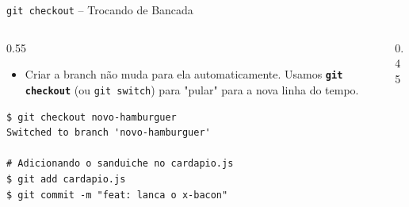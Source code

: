 \documentclass[aspectratio=169]{beamer}
\begin{document}
\begin{frame}[fragile]{\texttt{git checkout} -- Trocando de Bancada}
    \begin{columns}
        \begin{column}{0.55\textwidth}
            \begin{itemize}
                \item Criar a branch não muda para ela automaticamente. Usamos \textbf{\texttt{git checkout}} (ou \texttt{git switch}) para "pular" para a nova linha do tempo.
            \end{itemize}
\begin{lstlisting}[basicstyle=\ttfamily\tiny]
$ git checkout novo-hamburguer
Switched to branch 'novo-hamburguer'

# Adicionando o sanduiche no cardapio.js
$ git add cardapio.js
$ git commit -m "feat: lanca o x-bacon"
\end{lstlisting}
        \end{column}
        \begin{column}{0.45\textwidth}
            \begin{center}
            \end{center}
        \end{column}
    \end{columns}
\end{frame}
\end{document}
